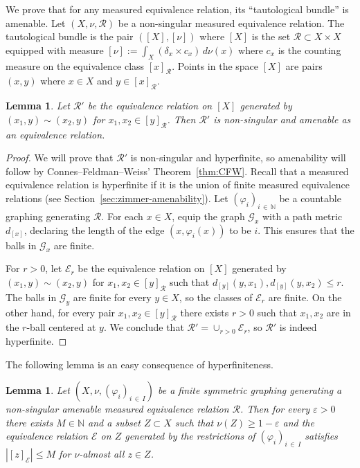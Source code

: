 \documentclass[10pt]{amsart}
\newtheorem{lemm}[theo]{Lemma}\newtheorem{prop}[theo]{Proposition}\newtheorem{coro}[theo]{Corollary}\newtheorem{conj}[theo]{Conjecture}
\theoremstyle{definition}\newtheorem{defi}[theo]{Definition}\newtheorem{rema}[theo]{Remark}\newtheorem{exam}[theo]{Example}\newtheorem{exem}[theo]{Example}\newtheorem{nota}[theo]{Notation}
\newcommand{\bbN}{\mathbb{N}}
\newcommand{\calR}{\mathcal{R}}
\newcommand{\calE}{\mathcal{E}}
\newcommand{\calG}{\mathcal{G}}
\begin{document}
We prove that for any measured equivalence relation, its ``tautological bundle'' is amenable. Let $(X,\nu, \calR)$ be a non-singular measured equivalence relation. The tautological bundle is the pair $([X],[\nu])$ where $[X]$ is the set $\calR\subset X\times X$ equipped with measure $[\nu]:=\int_X (\delta_x\times c_x) \, d\nu(x)$ where $c_x$ is the counting measure on the equivalence class $[x]_{\calR}$. Points in the space $[X]$ are pairs $(x,y)$ where $x\in X$ and $y\in [x]_\calR.$

\begin{lemm}\label{lem:TautER}
Let $\calR'$ be the equivalence relation on $[X]$ generated by $(x_1,y)\sim (x_2,y)$ for $x_1,x_2\in [y]_{\calR}$. Then $\calR'$ is non-singular and amenable as an equivalence relation.
\end{lemm}

\begin{proof}
We will prove that $\calR'$ is non-singular and hyperfinite, so amenability will follow by Connes--Feldman--Weiss' Theorem~\ref{thm:CFW}. Recall that a measured equivalence relation is hyperfinite if it is the union of finite measured equivalence relations (see Section~\ref{sec:zimmer-amenability}). Let $(\varphi_i)_{i\,\in\,\bbN}$ be a countable graphing generating $\calR$. For each $x\in X$, equip the graph $\calG_x$ with a path metric $d_{[x]}$, declaring the length of the edge $(x,\varphi_i(x))$ to be $i$. This ensures that the balls in $\calG_x$ are finite.

For $r>0$, let $\calE_r$ be the equivalence relation on $[X]$ generated by $(x_1,y)\sim (x_2,y)$ for $x_1,x_2\in [y]_{\calR}$ such that $d_{[y]}(y,x_1),d_{[y]}(y,x_2)\leq r.$ The balls in $\calG_y$ are finite for every $y\in X$, so the classes of $\calE_r$ are finite. On the other hand, for every pair $x_1,x_2\in [y]_{\calR}$ there exists $r>0$ such that $x_1,x_2$ are in the $r$-ball centered at $y$. We conclude that $\calR'=\cup_{r>0} \calE_r$, so $\calR'$ is indeed hyperfinite.
\end{proof}

The following lemma is an easy consequence of hyperfiniteness.

\begin{lemm}\label{lem:FiniteComponents1}
Let $(X,\nu,(\varphi_i)_{i\,\in\,I})$ be a finite symmetric graphing generating a non-singular amenable measured equivalence relation $\calR$. Then for every $\varepsilon>0$ there exists $M\in \bbN$ and a subset $Z\subset X$ such that $\nu(Z)\geq 1-\varepsilon$ and the equivalence relation $\calE$ on $Z$ generated by the restrictions of $(\varphi_i)_{i\,\in\,I}$ satisfies $|[z]_{\calE}|\leq M$ for $\nu$-almost all $z\in Z$.
\end{lemm}
\end{document}

